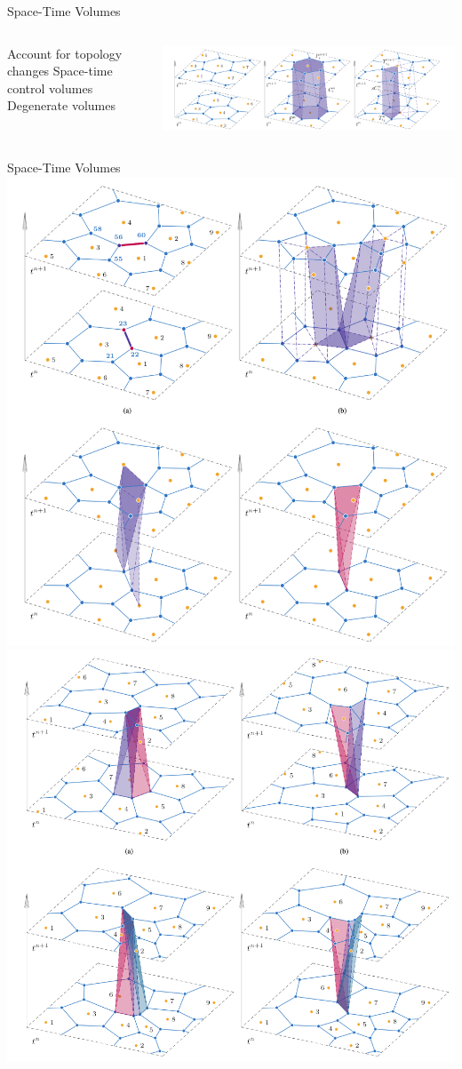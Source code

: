 \begin{frame}{Space-Time Volumes}
  \begin{columns}
    \begin{outline}
      \1 Account for topology changes
      \1 Space-time control volumes
      \1 Degenerate volumes
    \end{outline}
    \begin{center}
      \includegraphics[width=0.9\linewidth]{time_volumes_1.png}
    \end{center}
  \end{columns}
\end{frame}

\begin{frame}{Space-Time Volumes}
      \includegraphics[width=0.48\linewidth]{degen_1.png}
      \includegraphics[width=0.48\linewidth]{degen_2.png}
\end{frame}


